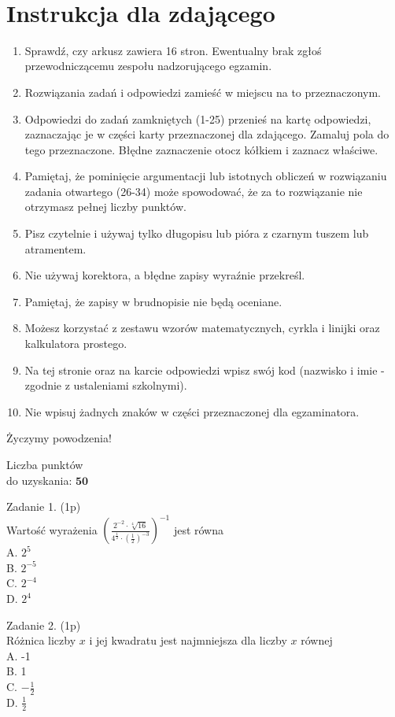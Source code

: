 \documentclass[10pt]{article}
\begin{document}
\(\qquad\)

\section*{Instrukcja dla zdającego}
\begin{enumerate}
  \item Sprawdź, czy arkusz zawiera 16 stron. Ewentualny brak zgłoś przewodniczącemu zespołu nadzorującego egzamin.
  \item Rozwiązania zadań i odpowiedzi zamieść w miejscu na to przeznaczonym.
  \item Odpowiedzi do zadań zamkniętych (1-25) przenieś na kartę odpowiedzi, zaznaczając je w części karty przeznaczonej dla zdającego. Zamaluj pola do tego przeznaczone. Błędne zaznaczenie otocz kółkiem i zaznacz właściwe.
  \item Pamiętaj, że pominięcie argumentacji lub istotnych obliczeń w rozwiązaniu zadania otwartego (26-34) może spowodować, że za to rozwiązanie nie otrzymasz pełnej liczby punktów.
  \item Pisz czytelnie i używaj tylko długopisu lub pióra z czarnym tuszem lub atramentem.
  \item Nie używaj korektora, a błędne zapisy wyraźnie przekreśl.
  \item Pamiętaj, że zapisy w brudnopisie nie będą oceniane.
  \item Możesz korzystać z zestawu wzorów matematycznych, cyrkla i linijki oraz kalkulatora prostego.
  \item Na tej stronie oraz na karcie odpowiedzi wpisz swój kod (nazwisko i imie - zgodnie z ustaleniami szkolnymi).
  \item Nie wpisuj żadnych znaków w części przeznaczonej dla egzaminatora.
\end{enumerate}

Życzymy powodzenia!

Liczba punktów\\
do uzyskania: \(\mathbf{5 0}\)

Zadanie 1. (1p)\\
Wartość wyrażenia \(\left(\frac{2^{-2} \cdot \sqrt[4]{16}}{4^{\frac{1}{2}} \cdot\left(\frac{1}{2}\right)^{-3}}\right)^{-1}\) jest równa\\
A. \(2^{5}\)\\
B. \(2^{-5}\)\\
C. \(2^{-4}\)\\
D. \(2^{4}\)

Zadanie 2. (1p)\\
Różnica liczby \(x\) i jej kwadratu jest najmniejsza dla liczby \(x\) równej\\
A. -1\\
B. 1\\
C. \(-\frac{1}{2}\)\\
D. \(\frac{1}{2}\)
\end{document}
